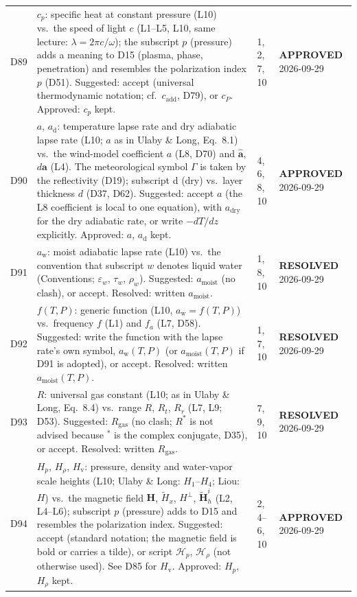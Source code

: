 \documentclass[11pt, oneside]{article}
\newcommand{\approved}{\textbf{APPROVED}}
\newcommand{\resolved}{\textbf{RESOLVED}}
\begin{document}
\begin{longtable}{l >{\raggedright\arraybackslash}p{} l l}
D89 & $c_p$: specific heat at constant pressure (L10) vs.\ the speed of light $c$ (L1--L5, L10, same lecture: $\lambda = 2\pi c/\omega$); the subscript $p$ (pressure) adds a meaning to D15 (plasma, phase, penetration) and resembles the polarization index $p$ (D51). Suggested: accept (universal thermodynamic notation; cf.\ $c_\mathrm{add}$, D79), or $c_P$. Approved: $c_p$ kept. & 1, 2, 7, 10 & \approved{} 2026-09-29 \\
D90 & $a$, $a_\mathrm{d}$: temperature lapse rate and dry adiabatic lapse rate (L10; $a$ as in Ulaby \& Long, Eq.~8.1) vs.\ the wind-model coefficient $a$ (L8, D70) and $\hat{\mathbf{a}}$, $d\mathbf{a}$ (L4). The meteorological symbol $\Gamma$ is taken by the reflectivity (D19); subscript d (dry) vs.\ layer thickness $d$ (D37, D62). Suggested: accept $a$ (the L8 coefficient is local to one equation), with $a_\mathrm{dry}$ for the dry adiabatic rate, or write $-dT/dz$ explicitly. Approved: $a$, $a_\mathrm{d}$ kept. & 4, 6, 8, 10 & \approved{} 2026-09-29 \\
D91 & $a_\mathrm{w}$: moist adiabatic lapse rate (L10) vs.\ the convention that subscript $w$ denotes liquid water (Conventions; $\varepsilon_w$, $\tau_w$, $\rho_w$). Suggested: $a_\mathrm{moist}$ (no clash), or accept. Resolved: written $a_\mathrm{moist}$. & 1, 8, 10 & \resolved{} 2026-09-29 \\
D92 & $f(T,P)$: generic function (L10, $a_\mathrm{w} = f(T,P)$) vs.\ frequency $f$ (L1) and $f_a$ (L7, D58). Suggested: write the function with the lapse rate's own symbol, $a_\mathrm{w}(T,P)$ (or $a_\mathrm{moist}(T,P)$ if D91 is adopted), or accept. Resolved: written $a_\mathrm{moist}(T,P)$. & 1, 7, 10 & \resolved{} 2026-09-29 \\
D93 & $R$: universal gas constant (L10; as in Ulaby \& Long, Eq.~8.4) vs.\ range $R$, $R_t$, $R_r$ (L7, L9; D53). Suggested: $R_\mathrm{gas}$ (no clash; $R^*$ is not advised because $^*$ is the complex conjugate, D35), or accept. Resolved: written $R_\mathrm{gas}$. & 7, 9, 10 & \resolved{} 2026-09-29 \\
D94 & $H_p$, $H_\rho$, $H_\mathrm{v}$: pressure, density and water-vapor scale heights (L10; Ulaby \& Long: $H_1$--$H_4$; Liou: $H$) vs.\ the magnetic field $\mathbf{H}$, $\tilde{H}_x$, $H^\perp$, $\tilde{\mathbf{H}}_h^i$ (L2, L4--L6); subscript $p$ (pressure) adds to D15 and resembles the polarization index. Suggested: accept (standard notation; the magnetic field is bold or carries a tilde), or script $\mathcal{H}_p$, $\mathcal{H}_\rho$ (not otherwise used). See D85 for $H_\mathrm{v}$. Approved: $H_p$, $H_\rho$ kept. & 2, 4--6, 10 & \approved{} 2026-09-29 \\

\end{longtable}
\end{document}
